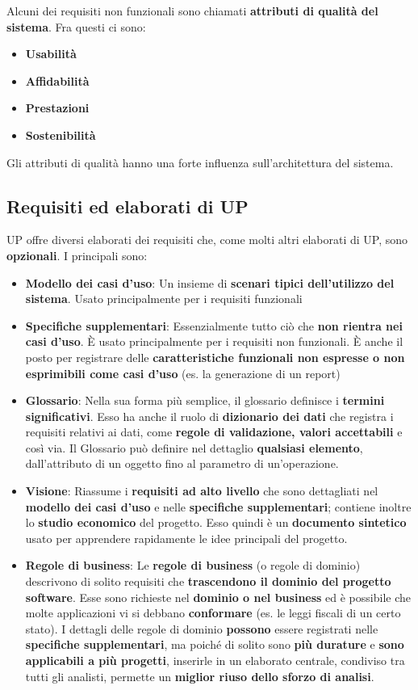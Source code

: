 \documentclass[12pt]{article}
\begin{document}
Alcuni dei requisiti non funzionali sono chiamati \textbf{attributi di qualità del sistema}.
Fra questi ci sono:
\begin{itemize}
    \item \textbf{Usabilità}
    \item \textbf{Affidabilità}
    \item \textbf{Prestazioni}
    \item \textbf{Sostenibilità}
\end{itemize} 
Gli attributi di qualità hanno una forte influenza sull'architettura del sistema.
\subsection{Requisiti ed elaborati di UP}
UP offre diversi elaborati dei requisiti che, come molti altri elaborati di UP, sono \textbf{opzionali}. I principali sono:
\begin{itemize}
    \item \textbf{Modello dei casi d'uso}: Un insieme di \textbf{scenari tipici dell'utilizzo del sistema}. Usato principalmente per i requisiti funzionali 
    \item \textbf{Specifiche supplementari}: Essenzialmente tutto ciò che \textbf{non rientra nei casi d'uso}. È usato principalmente per i requisiti non funzionali. È anche il posto per registrare delle \textbf{caratteristiche funzionali non espresse o non esprimibili come casi d'uso} (es. la generazione di un report)
    \item \textbf{Glossario}: Nella sua forma più semplice, il glossario definisce i \textbf{termini significativi}. Esso ha anche il ruolo di \textbf{dizionario dei dati} che registra i requisiti relativi ai dati, come \textbf{regole di validazione, valori accettabili} e così via. Il Glossario può definire nel dettaglio \textbf{qualsiasi elemento}, dall'attributo di un oggetto fino al parametro di un'operazione.
    \item \textbf{Visione}: Riassume i \textbf{requisiti ad alto livello} che sono dettagliati nel \textbf{modello dei casi d'uso} e nelle \textbf{specifiche supplementari}; contiene inoltre lo \textbf{studio economico} del progetto. Esso quindi è un \textbf{documento sintetico} usato per apprendere rapidamente le idee principali del progetto.
    \item \textbf{Regole di business}: Le \textbf{regole di business} (o regole di dominio) descrivono di solito requisiti che \textbf{trascendono il dominio del progetto software}. Esse sono richieste nel \textbf{dominio o nel business} ed è possibile che molte applicazioni vi si debbano \textbf{conformare} (es. le leggi fiscali di un certo stato). I dettagli delle regole di dominio \textbf{possono} essere registrati nelle \textbf{specifiche supplementari}, ma poiché di solito sono \textbf{più durature} e \textbf{sono applicabili a più progetti}, inserirle in un elaborato centrale, condiviso tra tutti gli analisti, permette un \textbf{miglior riuso dello sforzo di analisi}. 
\end{itemize}
\end{document}
